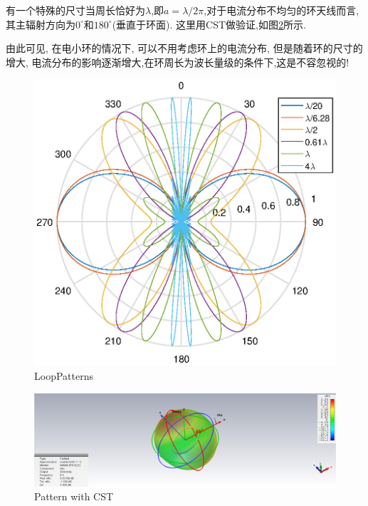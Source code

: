 有一个特殊的尺寸当周长恰好为$\lambda$,即$a=\lambda/2\pi$,对于电流分布不均匀的环天线而言,其主辐射方向为$0^\circ $和$180^\circ $(垂直于环面).
这里用CST做验证,如图\ref{fig:loopcst}所示.


由此可见, 在电小环的情况下, 可以不用考虑环上的电流分布, 但是随着环的尺寸的增大, 电流分布的影响逐渐增大,在环周长为波长量级的条件下,这是不容忽视的!
\begin{figure}[!ht]
	\centering
	\includegraphics[width=12cm]{loop_all.eps}
	\caption{LoopPatterns} \label{fig:loopall}
\end{figure}

\begin{figure}[!ht]
	\centering
	\includegraphics[width=12cm]{loop_cst.png}
	\caption{Pattern with CST} \label{fig:loopcst}
\end{figure}

